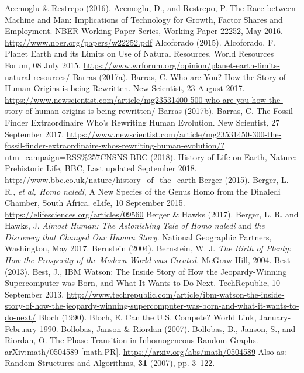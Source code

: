 \begin{multicols}{2}
\begin{thebibliography}{99}
 Acemoglu \& Restrepo (2016). Acemoglu, D., and Restrepo, P. The Race between Machine and Man: Implications of Technology for Growth, Factor Shares and Employment. NBER Working Paper Series, Working Paper 22252, May 2016. \url{http://www.nber.org/papers/w22252.pdf}
 Alcoforado (2015). Alcoforado, F. Planet Earth and its Limits on Use of Natural Resources. World Resources Forum, 08 July 2015. \url{https://www.wrforum.org/opinion/planet-earth-limits-natural-resources/}
 Barras (2017a). Barras, C. Who are You? How the Story of Human Origins is being Rewritten. New Scientist, 23 August 2017. \url{https://www.newscientist.com/article/mg23531400-500-who-are-you-how-the-story-of-human-origins-is-being-rewritten/}
 Barras (2017b). Barras, C. The Fossil Finder Extraordinaire Who's Rewriting Human Evolution. New Scientist, 27 September 2017. \url{https://www.newscientist.com/article/mg23531450-300-the-fossil-finder-extraordinaire-whos-rewriting-human-evolution/?utm_campaign=RSS%257CNSNS}
 BBC (2018). History of Life on Earth, Nature: Prehistoric Life, BBC, Last updated September 2018. \url{http://www.bbc.co.uk/nature/history_of_the_earth}
 Berger (2015). Berger, L. R., \textit{et al, Homo naledi}, A New Species of the Genus Homo from the Dinaledi Chamber, South Africa. eLife, 10 September 2015. \url{https://elifesciences.org/articles/09560}
 Berger \& Hawks (2017). Berger, L. R. and Hawks, J. \textit{Almost Human: The Astonishing Tale of Homo naledi} and \textit{the Discovery that Changed Our Human Story.} National Geographic Partners, Washington, May 2017.
 Bernstein (2004). Bernstein, W. J. \textit{The Birth of Plenty: How the Prosperity of the Modern World was Created.} McGraw-Hill, 2004.
 Best (2013). Best, J., IBM Watson: The Inside Story of How the Jeopardy-Winning Supercomputer was Born, and What It Wants to Do Next. TechRepublic, 10 September 2013. \url{http://www.techrepublic.com/article/ibm-watson-the-inside-story-of-how-the-jeopardy-winning-supercomputer-was-born-and-what-it-wants-to-do-next/}
 Bloch (1990). Bloch, E. Can the U.S. Compete? World Link, January-February 1990.
 Bollobas, Janson \& Riordan (2007). Bollobas, B., Janson, S., and Riordan, O. The Phase Transition in Inhomogeneous Random Graphs. arXiv:math/0504589 [math.PR]. \url{https://arxiv.org/abs/math/0504589} Also as: Random Structures and Algorithms, \textbf{31} (2007), pp. 3--122.

\end{thebibliography}
\end{multicols}
